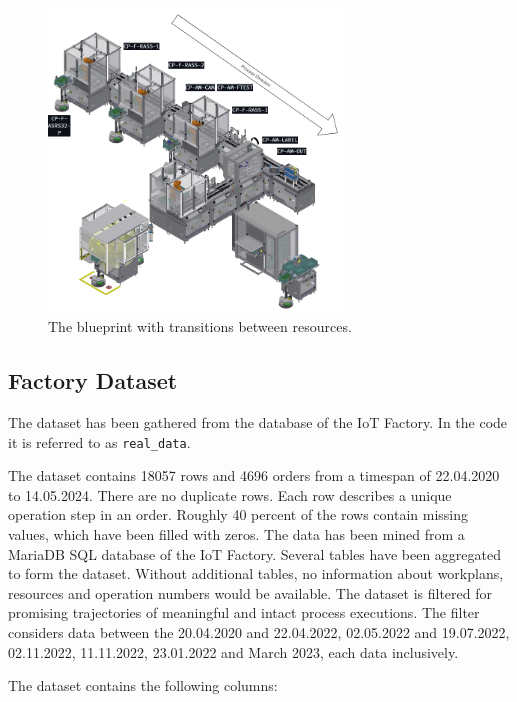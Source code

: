 \begin{figure}[H]
  \centering
  \includegraphics[width=0.7\textwidth]{figures/processdirection.png}
  \caption{The blueprint with transitions between resources.}
  \label{fig:transitions}
\end{figure}

\subsection*{Factory Dataset}

The dataset has been gathered from the database of the IoT Factory. In the code it is referred to as \texttt{real\_data}.

The dataset contains 18057 rows and 4696 orders from a timespan of 22.04.2020 to 14.05.2024. There are no duplicate rows. Each row describes a unique operation step in an order. Roughly 40 percent of the rows contain missing values, which have been filled with zeros.
The data has been mined from a MariaDB SQL database of the IoT Factory. Several tables have been aggregated to form the dataset. Without additional tables, no information about workplans, resources and operation numbers would be available. The dataset is filtered for promising trajectories of meaningful and intact process executions. The filter considers data between the 20.04.2020 and 22.04.2022, 02.05.2022 and 19.07.2022, 02.11.2022, 11.11.2022, 23.01.2022 and March 2023, each data inclusively.

The dataset contains the following columns:

